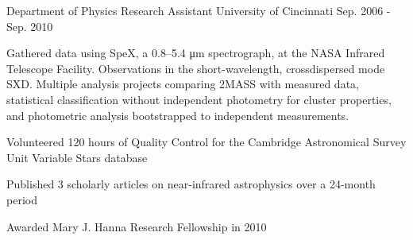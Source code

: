 \begin{cventries}
  \cventry
    {Department of Physics}
    {Research Assistant} %
    {University of Cincinnati}
    {Sep. 2006 - Sep. 2010}
    {
      \begin{cvparagraph}
        Gathered data using SpeX, a 0.8–5.4 μm spectrograph, at the NASA Infrared Telescope Facility.  Observations in the short-wavelength, crossdispersed mode SXD.  Multiple analysis projects comparing 2MASS with measured data, statistical classification without independent photometry for cluster properties, and photometric analysis bootstrapped to independent measurements.
      \end{cvparagraph}
      \begin{cvitems} %
        \item {Volunteered 120 hours of Quality Control for the Cambridge Astronomical Survey Unit Variable Stars database}
        \item {Published 3 scholarly articles on near-infrared astrophysics over a 24-month period}
        \item {Awarded Mary J. Hanna Research Fellowship in 2010}
      \end{cvitems}
    }


\end{cventries}
